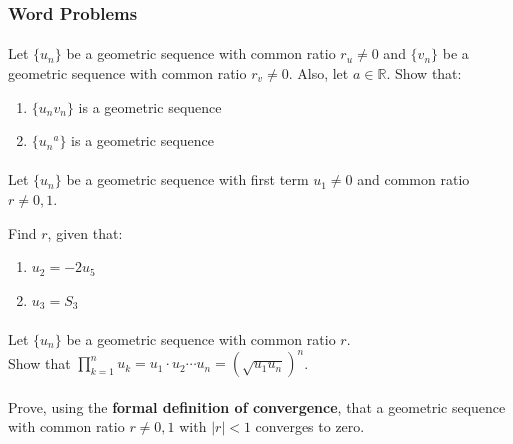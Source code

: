 \documentclass[12pt, a4paper, titlepage, twoside]{article}
\newcommand*{\R}{\mathbb{R}}
\begin{document}
	\hfill
	
	\subsubsection*{Word Problems}
	
	\paragraph{}
	 Let $\{u_n\}$ be a geometric sequence with common ratio $r_u \neq 0$ and
	$\{v_n\}$ be a geometric sequence with common ratio $r_v \neq 0$. Also, let $a \in \R$. Show that:
	
	\begin{enumerate}[label=\textbf{(\alph*)}]
		\item $\{u_n v_n\}$ is a geometric sequence
		\item $\{{u_n}^a\}$ is a geometric sequence
	\end{enumerate}
	
	\paragraph{}
	 Let $\{u_n\}$ be a geometric sequence with first term $u_1 \neq 0$ and common ratio $r \neq 0,1$.
	
	Find $r$, given that:
	
	\begin{enumerate}[label=\textbf{(\alph*)}]
		\item $u_2 = -2u_5$
		\item $u_3 = S_3$
	\end{enumerate}
	
	\paragraph{}
	 Let $\{u_n\}$ be a geometric sequence with common ratio $r$.\\
	
	Show that $\displaystyle \prod_{k=1}^n u_k = u_1 \cdot u_2 \cdots u_n = (\sqrt{u_1 u_n})^n$.
	
	\paragraph{}
	 Prove, using the \textbf{formal definition of convergence}, that a geometric sequence with common
	ratio $r \neq 0, 1$ with $|r| < 1$ converges to zero.
	
\end{document}
